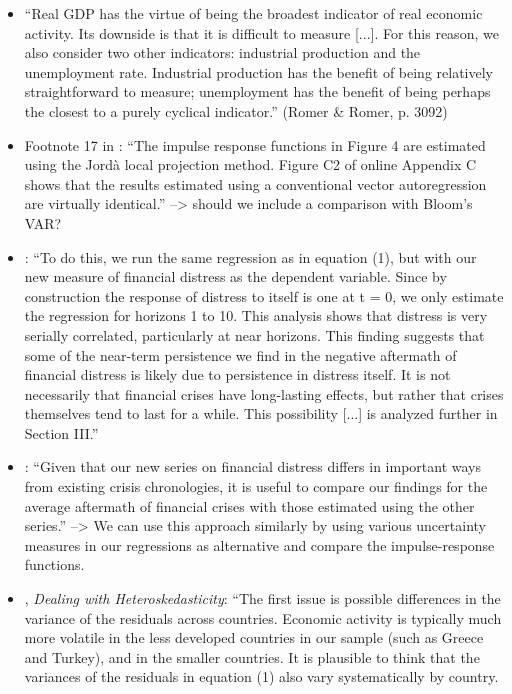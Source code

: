 \documentclass[a4paper,12pt,oneside,pointednumbers,numbers=noenddot,bibtotoc,bigheadings,liststotoc,chapterprefix=true]{scrbook}
\begin{document}
\begin{itemize}  
	\item ``Real GDP has the virtue of being the broadest indicator of real economic activity. Its downside is that it is difficult to measure [...]. For this reason, we also consider two other indicators: industrial production and the unemployment rate. Industrial production has the benefit of being relatively straightforward to measure; unemployment has the benefit of being perhaps the closest to a purely cyclical indicator.'' (Romer \& Romer, p. 3092)
	\item Footnote 17 in \citet{romandrom:17}: ``The impulse response functions in Figure 4 are estimated using the Jordà local projection method. Figure C2 of online Appendix C shows that the results estimated using a conventional vector autoregression are virtually identical.'' --> should we include a comparison with Bloom's VAR?
	\item \citet[p. 3096]{romandrom:17}: ``To do this, we run the same regression as in equation (1), but with our new measure of financial distress as the dependent variable. Since by construction the response of distress to itself is one at t = 0, we only estimate the regression for horizons 1 to 10. This analysis shows that distress is very serially correlated, particularly at near horizons. This finding suggests that some of the near-term persistence we find in the negative aftermath of financial distress is likely due to persistence in distress itself. It is not necessarily that financial crises have long-lasting effects, but rather that crises themselves tend to last for a while. This possibility [...] is analyzed further in Section III.''
	\item \citet[p. 3097]{romandrom:17}: ``Given that our new series on financial distress differs in important ways from existing crisis chronologies, it is useful to compare our findings for the average aftermath of financial crises with those estimated using the other series.'' --> We can use this approach similarly by using various uncertainty measures in our regressions as alternative and compare the impulse-response functions.
	\item \citet[p. 3099]{romandrom:17}, \textit{Dealing with Heteroskedasticity}: ``The first issue is possible differences in the variance of the residuals across countries. Economic activity is typically much more volatile in the less developed countries in our sample (such as Greece and Turkey), and in the smaller countries. It is plausible to think that the variances of the residuals in equation (1) also vary systematically by country. \\

\end{itemize}
\end{document}
